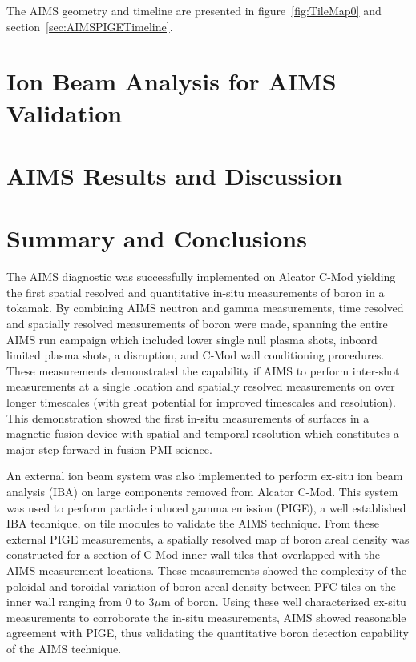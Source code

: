 \documentclass[final,3p,times,twocolumn]{elsarticle}
\begin{document}
The AIMS geometry and timeline are presented in figure~\ref{fig:TileMap0} and section~\ref{sec:AIMSPIGETimeline}.



\section{Ion Beam Analysis for AIMS Validation}

\section{AIMS Results and Discussion}

\section{Summary and Conclusions}

The AIMS diagnostic was successfully implemented on Alcator C-Mod yielding the first spatial resolved and quantitative in-situ measurements of boron in a tokamak.  By combining AIMS neutron and gamma measurements, time resolved and spatially resolved measurements of boron were made, spanning the entire AIMS run campaign which included lower single null plasma shots, inboard limited plasma shots, a disruption, and C-Mod wall conditioning procedures.  These measurements demonstrated the capability if AIMS to perform inter-shot measurements at a single location and spatially resolved measurements on over longer timescales (with great potential for improved timescales and resolution).  This demonstration showed the first in-situ measurements of surfaces in a magnetic fusion device with spatial and temporal resolution which constitutes a major step forward in fusion PMI science.

An external ion beam system was also implemented to perform ex-situ ion beam analysis (IBA) on large components removed from Alcator C-Mod.  This system was used to perform particle induced gamma emission (PIGE), a well established IBA technique, on tile modules to validate the AIMS technique.  From these external PIGE measurements, a spatially resolved map of boron areal density was constructed for a section of C-Mod inner wall tiles that overlapped with the AIMS measurement locations.  These measurements showed the complexity of the poloidal and toroidal variation of boron areal density between PFC tiles on the inner wall ranging from 0 to 3$\mu$m of boron.  Using these well characterized ex-situ measurements to corroborate the in-situ measurements, AIMS showed reasonable agreement with PIGE, thus validating the quantitative boron detection capability of the AIMS technique.


{}

\end{document}
